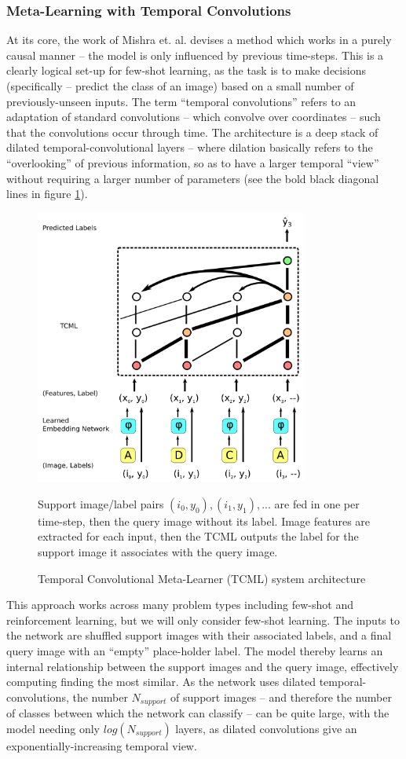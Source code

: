 \documentclass{report}
\begin{document}
\subsubsection{Meta-Learning with Temporal Convolutions}
At its core, the work of Mishra et. al. \parencite{mlwtc} devises a method which works in a purely causal manner -- the model is only influenced by previous time-steps. This is a clearly logical set-up for few-shot learning, as the task is to make decisions (specifically -- predict the class of an image) based on a small number of previously-unseen inputs. The term ``temporal convolutions'' refers to an adaptation of standard convolutions -- which convolve over coordinates -- such that the convolutions occur through time. The architecture is a deep stack of dilated temporal-convolutional layers -- where dilation basically refers to the ``overlooking'' of previous information, so as to have a larger temporal ``view'' without requiring a larger number of parameters (see the bold black diagonal lines in figure \ref{fig:temporal:1}). \par
\begin{figure}[h]
 \centering
 \includegraphics[width=9cm]{temporal}
 \caption{Temporal Convolutional Meta-Learner (TCML) system architecture}
 \label{fig:temporal:1}
 Support image/label pairs $(i_0,y_0), (i_1,y_1), ...$ are fed in one per time-step, then the query image without its label. Image features are extracted for each input, then the TCML outputs the label for the support image it associates with the query image.
\end{figure}
This approach works across many problem types including few-shot and reinforcement learning, but we will only consider few-shot learning. The inputs to the network are shuffled support images with their associated labels, and a final query image with an ``empty'' place-holder label. The model thereby learns an internal relationship between the support images and the query image, effectively computing finding the most similar. As the network uses dilated temporal-convolutions, the number $N_{support}$ of support images -- and therefore the number of classes between which the network can classify -- can be quite large, with the model needing only $log(N_{support})$ layers, as dilated convolutions give an exponentially-increasing temporal view.  \par
\end{document}
